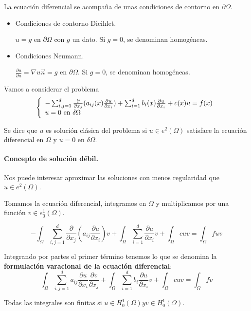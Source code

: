 	La ecuación diferencial se acompaña de unas condiciones de contorno  en $\partial \Omega$.
	
	\begin{itemize}
		\item Condiciones de contorno Dicihlet.
		
		$u=g$ en $\partial\Omega$ con $g$ un dato. 
		Si $g=0$, se denominan homogéneas.
		\item Condiciones Neumann.
		
		$\frac{\partial u}{\partial n}=\nabla u \vec{n}=g$ en $\partial \Omega$.
		Si $g=0$, se denominan homogéneas.
	\end{itemize}
	
	Vamos a considerar el problema
	\begin{equation*}
		\left\{
		\begin{array}{l l l}
			-\sum_{i,j=1}^d \frac{\partial}{\partial x_j}(a_{ij}(x)\frac{\partial u}{\partial x_i}) + \sum_{i=1}^d b_i(x)\frac{\partial u}{\partial x_i}+c(x) u = f(x)\\
			u = 0 \text{ en } \delta \Omega
		\end{array}
		\right.
	\end{equation*}
	
	Se dice que $u$ es solución clásica del problema si $u\in e^2(\Omega)$ satisface la ecuación diferencial en $\Omega$ y $u = 0$ en $\delta \Omega$.
	
	\paragraph{Concepto de solución débil.}
	Nos puede interesar aproximar las soluciones con menos regularidad que $u\in e^2(\Omega)$.
	
	Tomamos la ecuación diferencial, integramos en $\Omega$ y multiplicamos por una función $v\in e^1_0(\Omega)$.
	
	$$-\int_{\Omega} \sum _{i,j=1}^d \frac{\partial}{\partial x_j}(a_{ij}\frac{\partial u}{\partial x_i})v + \int_{\Omega}\sum_{i=1}^d \frac{\partial u}{\partial x_i}v + \int_{\Omega} c u v = \int_{\Omega} fuv$$
	
	Integrando por partes el primer término tenemos lo que se denomina la \textbf{formulación varacional de la ecuación diferencial}:
	$$\int_{\Omega} \sum_{i,j=1}^d a_{ij} \frac{\partial u}{\partial x_i}\frac{\partial v}{\partial x_j} + \int_{\Omega}\sum_{i=1}^d b_i \frac{\partial u}{\partial x_i}v + \int_{\Omega} cuv = \int_{\Omega} f v $$
	
	Todas las integrales son finitas si $u\in H_0^1(\Omega) y v\in H_0^1(\Omega)$.
	
